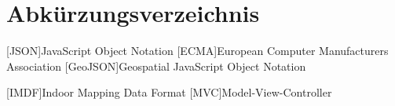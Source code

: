\chapter*{Abkürzungsverzeichnis}

\begin{acronym}
	[JSON]{JavaScript Object Notation}
	[ECMA]{European Computer Manufacturers Association}
	[GeoJSON]{Geospatial JavaScript Object Notation}

	[IMDF]{Indoor Mapping Data Format}
	[MVC]{Model-View-Controller}
\end{acronym}

\clearpage
